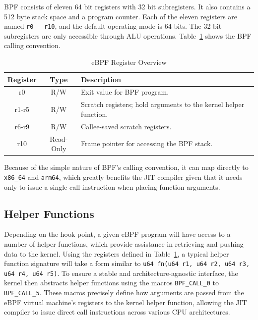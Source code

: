 \ac{BPF} consists of eleven 64 bit registers with 32 bit subregisters. It also contains a 512 byte stack space and a program counter. Each of the eleven registers are named \texttt{r0 - r10}, and the default operating mode is 64 bits. The 32 bit subregisters are only accessible through ALU operations. Table~\ref{tab:ebpf_registers} shows the BPF calling convention.

\begin{table}[h]
    \centering
    \begin{tabular}{c c p{6cm}}
        \toprule
        Register & Type     & Description \\
        \midrule
        r0       & R/W      & Exit value for BPF program. \\
        r1-r5    & R/W      & Scratch registers; hold arguments to the kernel helper function. \\
        r6-r9    & R/W      & Callee-saved scratch registers. \\
        r10      & Read-Only & Frame pointer for accessing the BPF stack. \\
        \bottomrule
    \end{tabular}
    \caption{eBPF Register Overview}
    \label{tab:ebpf_registers}
\end{table}

Because of the simple nature of \ac{BPF}'s calling convention, it can map directly to \texttt{x86\_64} and \texttt{arm64}, which greatly benefits the \ac{JIT} compiler given that it needs only to issue a single call instruction when placing function arguments.

\subsection{Helper Functions}
\label{subsec:helper-functions}
Depending on the hook point, a given \ac{eBPF} program will have access to a number of helper functions, which provide assistance in retrieving and pushing data to the kernel. Using the registers defined in Table~\ref{tab:ebpf_registers}, a typical helper function signature will take a form similar to \texttt{u64 fn(u64 r1, u64 r2, u64 r3, u64 r4, u64 r5)}. To ensure a stable and architecture-agnostic interface, the kernel then abstracts helper functions using the macros \texttt{BPF\_CALL\_0} to \texttt{BPF\_CALL\_5}. These macros precisely define how arguments are passed from the eBPF virtual machine's registers to the kernel helper function, allowing the JIT compiler to issue direct call instructions across various CPU architectures.

